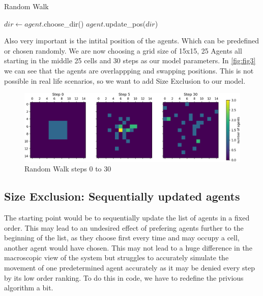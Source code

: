 \begin{algorithm}
\caption{Random Walk}\label{RW}
\begin{algorithmic}[1]
      \State $dir \gets agent.$choose\_dir()
      \State $agent.$update\_pos($dir$)
   \EndFor
\EndFor
\EndProcedure
\end{algorithmic}
\end{algorithm}

Also very important is the intital position of the agents. Which can be predefined or chosen randomly. 
We are now choosing a grid size of 15x15, 25 Agents all starting in the middle 25 cells and 30 steps as our model parameters.
In \autoref{fig:fig3} we can see that the agents are overlappping and swapping positions.
This is not possible in real life scenarios, so we want to add Size Exclusion to our model.

\begin{figure}
   \begin{center}
   \includegraphics[width=\linewidth]{content/figures/RW_s0-s30.png} 
   \caption{Random Walk steps 0 to 30}
   \label{fig:fig3}
   \end{center}
\end{figure}

\subsection{Size Exclusion: Sequentially updated agents}
The starting point would be to sequentially update the list of agents in a fixed order. 
This may lead to an undesired effect of prefering agents further to the beginning of the list, 
as they choose first every time and may occupy a cell, another agent would have chosen. 
This may not lead to a huge difference in the macroscopic view of the system but struggles to accurately 
simulate the movement of one predetermined agent accurately as it may be denied every step by its low order ranking.
To do this in code, we have to redefine the privious algorithm a bit. 

